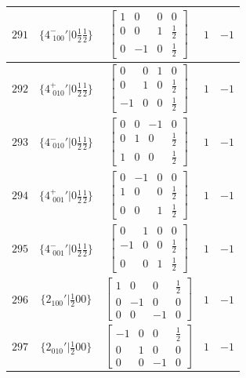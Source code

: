 \documentclass[fleqn,8pt]{jsarticle}
\begin{document}
\begin{longtable}{ccccc}
$ 291 $ & $ \{4^{-}_{\,\,100}{}'|0 \frac{1}{2} \frac{1}{2}\} $ & $ \begin{bmatrix} 1 & 0 & 0 & 0 \\ 0 & 0 & 1 & \frac{1}{2} \\ 0 & -1 & 0 & \frac{1}{2} \end{bmatrix} $ & $ 1 $ & $ -1 $ \\ \hline
$ 292 $ & $ \{4^{+}_{\,\,010}{}'|0 \frac{1}{2} \frac{1}{2}\} $ & $ \begin{bmatrix} 0 & 0 & 1 & 0 \\ 0 & 1 & 0 & \frac{1}{2} \\ -1 & 0 & 0 & \frac{1}{2} \end{bmatrix} $ & $ 1 $ & $ -1 $ \\ \hline
$ 293 $ & $ \{4^{-}_{\,\,010}{}'|0 \frac{1}{2} \frac{1}{2}\} $ & $ \begin{bmatrix} 0 & 0 & -1 & 0 \\ 0 & 1 & 0 & \frac{1}{2} \\ 1 & 0 & 0 & \frac{1}{2} \end{bmatrix} $ & $ 1 $ & $ -1 $ \\ \hline
$ 294 $ & $ \{4^{+}_{\,\,001}{}'|0 \frac{1}{2} \frac{1}{2}\} $ & $ \begin{bmatrix} 0 & -1 & 0 & 0 \\ 1 & 0 & 0 & \frac{1}{2} \\ 0 & 0 & 1 & \frac{1}{2} \end{bmatrix} $ & $ 1 $ & $ -1 $ \\ \hline
$ 295 $ & $ \{4^{-}_{\,\,001}{}'|0 \frac{1}{2} \frac{1}{2}\} $ & $ \begin{bmatrix} 0 & 1 & 0 & 0 \\ -1 & 0 & 0 & \frac{1}{2} \\ 0 & 0 & 1 & \frac{1}{2} \end{bmatrix} $ & $ 1 $ & $ -1 $ \\ \hline
$ 296 $ & $ \{2{}_{100}{}'|\frac{1}{2} 0 0\} $ & $ \begin{bmatrix} 1 & 0 & 0 & \frac{1}{2} \\ 0 & -1 & 0 & 0 \\ 0 & 0 & -1 & 0 \end{bmatrix} $ & $ 1 $ & $ -1 $ \\ \hline
$ 297 $ & $ \{2{}_{010}{}'|\frac{1}{2} 0 0\} $ & $ \begin{bmatrix} -1 & 0 & 0 & \frac{1}{2} \\ 0 & 1 & 0 & 0 \\ 0 & 0 & -1 & 0 \end{bmatrix} $ & $ 1 $ & $ -1 $ \\ \hline

\end{longtable}
\end{document}
